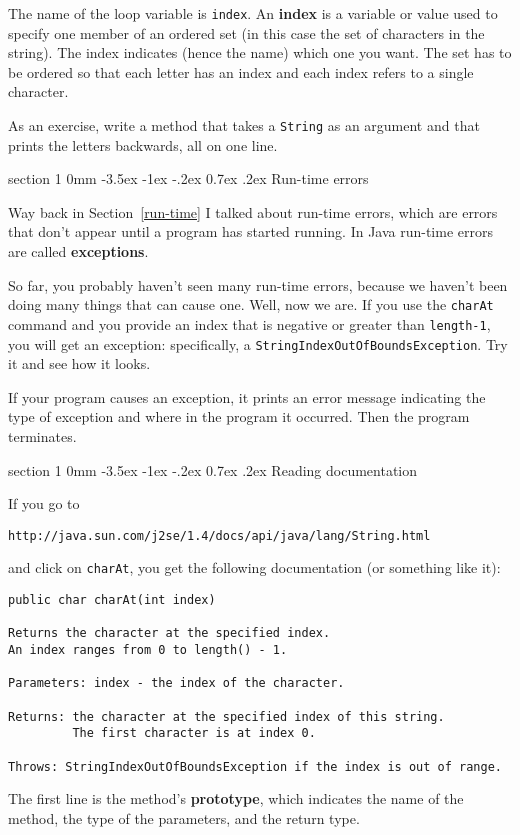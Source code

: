 \documentclass{book}
\makeatletter
\renewcommand{\section}{\@startsection 
    {section} {1} {0mm}%
    {-3.5ex \@plus -1ex \@minus -.2ex}%
    {0.7ex \@plus.2ex}%
    {\normalfont\Large\bfseries}}
\makeatother
\begin{document}

The name of the loop variable is {\tt index}.  An {\bf
index} is a variable or value used to specify one member of an ordered
set (in this case the set of characters in the string).  The index
indicates (hence the name) which one you want.  The set has to be
ordered so that each letter has an index and each index
refers to a single character.

As an exercise, write a method that takes a {\tt String}
as an argument and that prints the letters backwards, all on
one line.


\section{Run-time errors}

Way back in Section~\ref{run-time} I talked about run-time errors,
which are errors that don't appear until a program has started
running.  In Java run-time errors are called {\bf exceptions}.

So far, you probably haven't seen many run-time errors, because we
haven't been doing many things that can cause one.  Well, now we are.
If you use the {\tt charAt} command and you provide an index that is
negative or greater than {\tt length-1}, you will get an exception:
specifically, a {\tt StringIndexOutOfBoundsException}.  Try it
and see how it looks.

If your program causes an exception, it prints an error message
indicating the type of exception and where in the program it
occurred.  Then the program terminates.


\section{Reading documentation}

If you go to

\begin{verbatim}
http://java.sun.com/j2se/1.4/docs/api/java/lang/String.html
\end{verbatim}
%
and click on {\tt charAt}, you get the following documentation
(or something like it):

\begin{verbatim}
public char charAt(int index)

Returns the character at the specified index.
An index ranges from 0 to length() - 1. 

Parameters: index - the index of the character. 

Returns: the character at the specified index of this string.
         The first character is at index 0. 

Throws: StringIndexOutOfBoundsException if the index is out of range.
\end{verbatim}
%
The first line is the method's {\bf prototype}, which indicates the
name of the method, the type of the parameters, and the return type.
\end{document}
